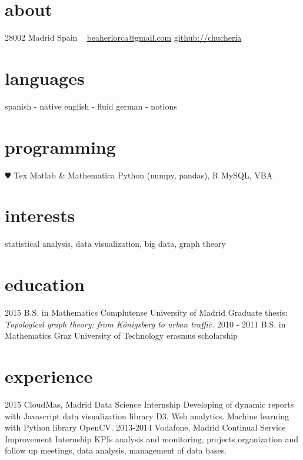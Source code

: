 \documentclass[]{friggeri-cv}
\begin{document}
\ifenglish
{}
       {}


\begin{aside}
  \section{about}
    28002 Madrid
    Spain
    ~
    \href{mailto:beaherlorca@gmail.com}{beaherlorca@gmail.com}
    \href{https://github.com/chucheria}{github://chucheria}
  \section{languages}
    spanish - native
    english - fluid
    german - notions
  \section{programming}
    {\color{red} $\varheartsuit$} Tex
    Matlab \& Mathematica
    Python (numpy, pandas), R
    MySQL, VBA
\end{aside}

\section{interests}

statistical analysis, data visualization, big data, graph theory


\section{education}

\begin{entrylist}
  \entry
    {2015}
    {B.S. in Mathematics}
    {Complutense University of Madrid}
    {Graduate thesis: \emph{Topological graph theory: from Königsberg to urban traffic.}}
  \entry
    {2010 - 2011}
    {B.S. in Mathematics}
    {Graz University of Technology}
    {erasmus scholarship}
\end{entrylist}

\section{experience}

\begin{entrylist}
  \entry
    {2015}
    {CloudMas, Madrid}
    {Data Science Internship}
    {Developing of dynamic reports with Javascript data visualization library D3. Web analytics. Machine learning with Python library OpenCV.}
  \entry
    {2013-2014}
    {Vodafone, Madrid}
    {Continual Service Improvement Internship}
    {KPIs analysis and monitoring, projects organization and follow up meetings, data analysis, management of data bases.}
\end{entrylist}
\end{document}
